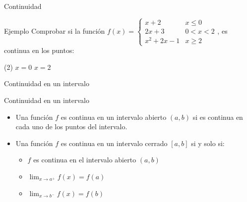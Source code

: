\documentclass[8pt]{beamer}
\newcommand{\limite}[2]{\displaystyle \lim_{x \rightarrow #1}{#2}}
\begin{document}
\begin{frame}[t]{Continuidad}
\begin{exampleblock}{Ejemplo}
Comprobar si la función $f(x)=\begin{cases} x+2 & x \leq 0 \\ 2x+3 & 0 < x <2 \\ x^2+2x-1 & x \geq 2 \end{cases} $, es continua en los puntos:
\begin{tasks}[label=\alph*)](2)
\task $x=0$
\task $x=2$
\end{tasks}
\end{exampleblock}


\end{frame}

\begin{frame}[t]{Continuidad en un intervalo}
\begin{alertblock}{Continuidad en un intervalo}
\begin{itemize}
\item Una función $f$ es continua en un intervalo abierto $(a,b)$ si es continua en cada uno de los puntos del intervalo.
\item Una función $f$ es continua en un intervalo cerrado $[a,b]$ si y solo si:
\begin{itemize}
\item $f$ es continua en el intervalo abierto $(a,b)$
\item $\limite{a^+}{f(x)}=f(a)$
\item $\limite{b^-}{f(x)}=f(b)$
\end{itemize}
\end{itemize}
\end{alertblock}
\end{frame}
\end{document}
